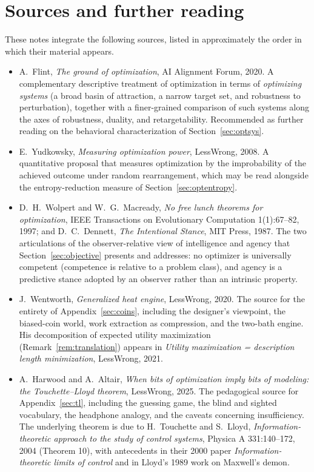 \documentclass[11pt]{article}
\begin{document}
\section*{Sources and further reading}

These notes integrate the following sources, listed in approximately the order in which their material appears.

\begin{itemize}[leftmargin=2em]
  \item A.~Flint, \emph{The ground of optimization}, AI Alignment Forum, 2020. A complementary descriptive treatment of optimization in terms of \emph{optimizing systems} (a broad basin of attraction, a narrow target set, and robustness to perturbation), together with a finer-grained comparison of such systems along the axes of robustness, duality, and retargetability. Recommended as further reading on the behavioral characterization of Section~\ref{sec:optsys}.
  \item E.~Yudkowsky, \emph{Measuring optimization power}, LessWrong, 2008. A quantitative proposal that measures optimization by the improbability of the achieved outcome under random rearrangement, which may be read alongside the entropy-reduction measure of Section~\ref{sec:optentropy}.
  \item D.~H.~Wolpert and W.~G.~Macready, \emph{No free lunch theorems for optimization}, IEEE Transactions on Evolutionary Computation 1(1):67--82, 1997; and D.~C.~Dennett, \emph{The Intentional Stance}, MIT Press, 1987. The two articulations of the observer-relative view of intelligence and agency that Section~\ref{sec:objective} presents and addresses: no optimizer is universally competent (competence is relative to a problem class), and agency is a predictive stance adopted by an observer rather than an intrinsic property.
  \item J.~Wentworth, \emph{Generalized heat engine}, LessWrong, 2020. The source for the entirety of Appendix~\ref{sec:coins}, including the designer's viewpoint, the biased-coin world, work extraction as compression, and the two-bath engine. His decomposition of expected utility maximization (Remark~\ref{rem:translation}) appears in \emph{Utility maximization = description length minimization}, LessWrong, 2021.
  \item A.~Harwood and A.~Altair, \emph{When bits of optimization imply bits of modeling: the Touchette--Lloyd theorem}, LessWrong, 2025. The pedagogical source for Appendix~\ref{sec:tl}, including the guessing game, the blind and sighted vocabulary, the headphone analogy, and the caveats concerning insufficiency. The underlying theorem is due to H.~Touchette and S.~Lloyd, \emph{Information-theoretic approach to the study of control systems}, Physica A 331:140--172, 2004 (Theorem 10), with antecedents in their 2000 paper \emph{Information-theoretic limits of control} and in Lloyd's 1989 work on Maxwell's demon.

\end{itemize}
\end{document}

